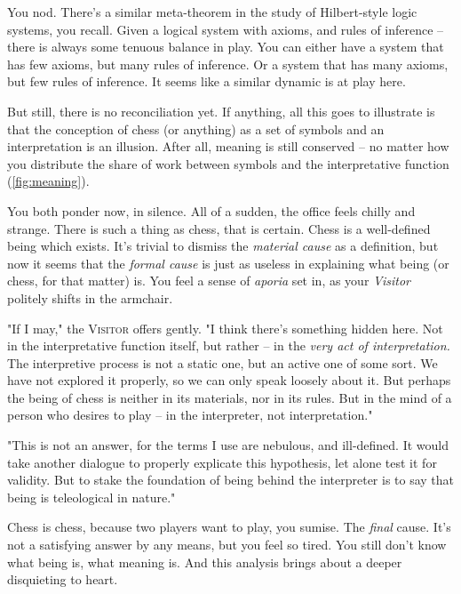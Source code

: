 You nod. There's a similar meta-theorem in the study of Hilbert-style logic systems, you recall. Given a logical system with axioms, and rules of inference -- there is always some tenuous balance in play. You can either have a system that has few axioms, but many rules of inference. Or a system that has many axioms, but few rules of inference. It seems like a similar dynamic is at play here.

But still, there is no reconciliation yet. If anything, all this goes to illustrate is that the conception of chess (or anything) as a set of symbols and an interpretation is an illusion. After all, meaning is still conserved -- no matter how you distribute the share of work between symbols and the interpretative function (\autoref{fig:meaning}).

You both ponder now, in silence. All of a sudden, the office feels chilly and strange. There is such a thing as chess, that is certain. Chess is a well-defined being which exists. It's trivial to dismiss the \emph{material cause} as a definition, but now it seems that the \emph{formal cause} is just as useless in explaining what being (or chess, for that matter) is. You feel a sense of \emph{aporia} set in, as your \emph{Visitor} politely shifts in the armchair.

"If I may," the \textsc{Visitor} offers gently. "I think there's something hidden here. Not in the interpretative function itself, but rather -- in the \emph{very act of interpretation.} The interpretive process is not a static one, but an active one of some sort. We have not explored it properly, so we can only speak loosely about it. But perhaps the being of chess is neither in its materials, nor in its rules. But in the mind of a person who desires to play -- in the interpreter, not interpretation."

"This is not an answer, for the terms I use are nebulous, and ill-defined. It would take another dialogue to properly explicate this hypothesis, let alone test it for validity. But to stake the foundation of being behind the interpreter is to say that being is teleological in nature."

Chess is chess, because two players want to play, you sumise. The \emph{final} cause. It's not a satisfying answer by any means, but you feel so tired. You still don't know what being is, what meaning is. And this analysis brings about a deeper disquieting to heart.

